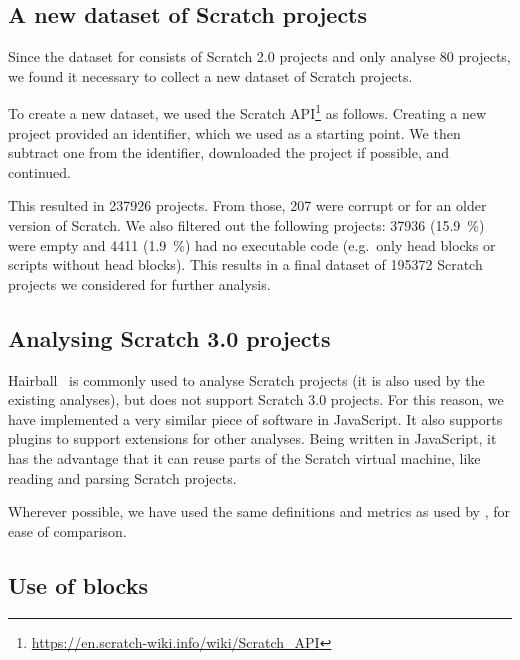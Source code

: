 \documentclass[../main]{subfiles}
\begin{document}
\subsection{A new dataset of Scratch projects}\label{subsec:a-new-dataset-of-scratch-projects}

Since the dataset for \textcite{aivaloglouHowKidsCode2016} consists of Scratch 2.0 projects and \textcite{fronzaApproachEvaluateComplexity2020} only analyse 80 projects, we found it necessary to collect a new dataset of Scratch projects.

To create a new dataset, we used the Scratch API\footnote{\url{https://en.scratch-wiki.info/wiki/Scratch_API}} as follows.
Creating a new project provided an identifier, which we used as a starting point.
We then subtract one from the identifier, downloaded the project if possible, and continued.

This resulted in \num{237926} projects.
From those, \num{207} were corrupt or for an older version of Scratch.
We also filtered out the following projects: \num{37936} (\qty{15.9}{\percent}) were empty and \num{4411} (\qty{1.9}{\percent}) had no executable code (e.g.\ only head blocks or scripts without head blocks).
This results in a final dataset of \num{195372} Scratch projects we considered for further analysis.

\subsection{Analysing Scratch 3.0 projects}\label{subsec:analysing-scratch-3.0-projects}

Hairball~\autocite{boeHairballLintinspiredStatic2013} is commonly used to analyse Scratch projects (it is also used by the existing analyses), but does not support Scratch 3.0 projects.
For this reason, we have implemented a very similar piece of software in JavaScript.
It also supports plugins to support extensions for other analyses.
Being written in JavaScript, it has the advantage that it can reuse parts of the Scratch virtual machine, like reading and parsing Scratch projects.

Wherever possible, we have used the same definitions and metrics as used by \textcite{aivaloglouHowKidsCode2016}, for ease of comparison.

\subsection{Use of blocks}\label{subsec:use-of-blocks}
\end{document}
